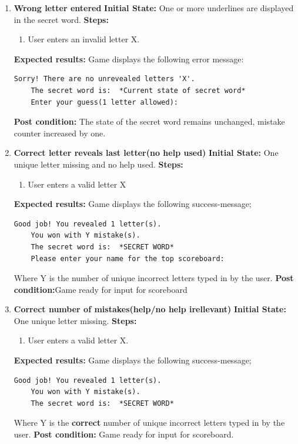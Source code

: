 \documentclass{article}
\begin{document}
\begin{enumerate}
	\item \textbf{Wrong letter entered}\newline
	\textbf{Initial State:} One or more underlines are displayed in the secret word.\newline
	\textbf{Steps:}
	\begin{enumerate}
	\item User enters an invalid letter X.
	\end{enumerate}
	\textbf{Expected results:} Game displays the following error message: 
	\begin{lstlisting}[breaklines, gobble=8]
	Sorry! There are no unrevealed letters 'X'. 
	The secret word is:  *Current state of secret word*
	Enter your guess(1 letter allowed):
	\end{lstlisting}
	\textbf{Post condition:} The state of the secret word remains unchanged, mistake counter increased by one.

	\item \textbf{Correct letter reveals last letter(no help used)}\newline
	\textbf{Initial State:} One unique letter missing and no help used.\newline
	\textbf{Steps:}
	\begin{enumerate}
	\item User enters a valid letter X
	\end{enumerate}
	\textbf{Expected results:} Game displays the following success-message;
	\begin{lstlisting}[breaklines, gobble=8]
	Good job! You revealed 1 letter(s).
	You won with Y mistake(s).
	The secret word is:  *SECRET WORD*
	Please enter your name for the top scoreboard:
	\end{lstlisting}
	Where Y is the number of unique incorrect letters typed in by the user.\newline
	\textbf{Post condition:}Game ready for input for scoreboard\newline
	
	\item \textbf{Correct number of mistakes(help/no help irellevant)}\newline
	\textbf{Initial State:} One unique letter missing.\newline
	\textbf{Steps:}
	\begin{enumerate}
	\item User enters a valid letter X.
	\end{enumerate}
	\textbf{Expected results:} Game displays the following success-message;
	\begin{lstlisting}[breaklines, gobble=8]
	Good job! You revealed 1 letter(s).
	You won with Y mistake(s).
	The secret word is:  *SECRET WORD*
	\end{lstlisting}
	Where Y is the \textbf{correct} number of unique incorrect letters typed in by the user.\newline
	\textbf{Post condition:} Game ready for input for scoreboard.


\end{enumerate}
\end{document}
